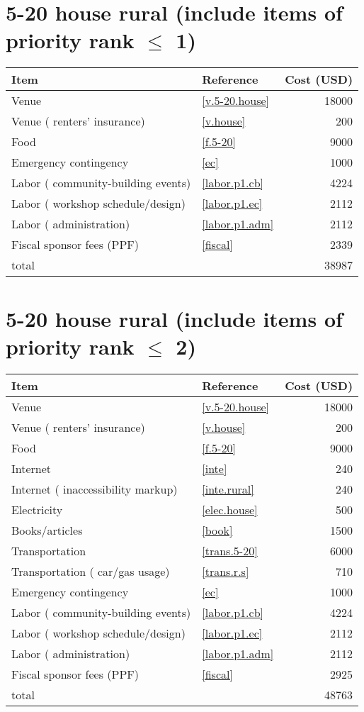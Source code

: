 \section*{5-20 house rural (include items of priority rank $\leq$ 1)}
\begin{center}
\begin{tabular}{llr}
Item & Reference & Cost (USD) \\ \hline
Venue & \ref{v.5-20.house} & 18000 \\
Venue ( renters' insurance) & \ref{v.house} & 200 \\
Food & \ref{f.5-20} & 9000 \\
Emergency contingency & \ref{ec} & 1000 \\
Labor ( community-building events) & \ref{labor.p1.cb} & 4224 \\
Labor ( workshop schedule/design) & \ref{labor.p1.ec} & 2112 \\
Labor ( administration) & \ref{labor.p1.adm} & 2112 \\
Fiscal sponsor fees (PPF) & \ref{fiscal} & 2339 \\ \hline
total &  & 38987
\end{tabular}
\end{center}
\newpage
\section*{5-20 house rural (include items of priority rank $\leq$ 2)}
\begin{center}
\begin{tabular}{llr}
Item & Reference & Cost (USD) \\ \hline
Venue & \ref{v.5-20.house} & 18000 \\
Venue ( renters' insurance) & \ref{v.house} & 200 \\
Food & \ref{f.5-20} & 9000 \\
Internet & \ref{inte} & 240 \\
Internet ( inaccessibility markup) & \ref{inte.rural} & 240 \\
Electricity & \ref{elec.house} & 500 \\
Books/articles & \ref{book} & 1500 \\
Transportation & \ref{trans.5-20} & 6000 \\
Transportation ( car/gas usage) & \ref{trans.r.s} & 710 \\
Emergency contingency & \ref{ec} & 1000 \\
Labor ( community-building events) & \ref{labor.p1.cb} & 4224 \\
Labor ( workshop schedule/design) & \ref{labor.p1.ec} & 2112 \\
Labor ( administration) & \ref{labor.p1.adm} & 2112 \\
Fiscal sponsor fees (PPF) & \ref{fiscal} & 2925 \\ \hline
total &  & 48763
\end{tabular}
\end{center}
\newpage
